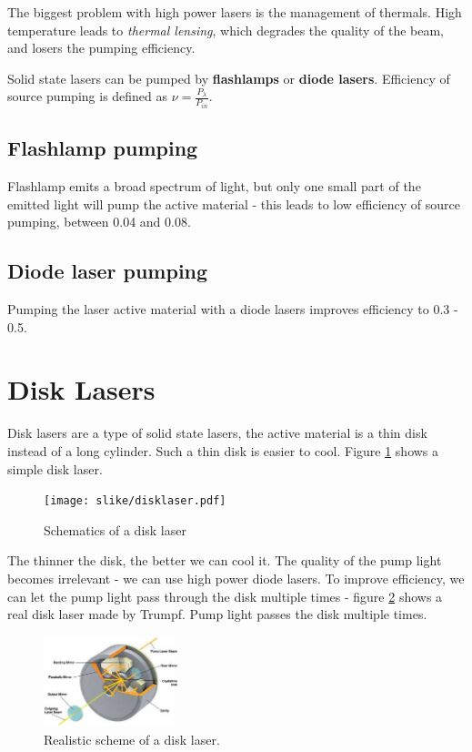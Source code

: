 The biggest problem with high power lasers is the management of thermals. 
High temperature leads to \textit{thermal lensing}, which degrades the quality of the beam, and 
losers the pumping efficiency. 

Solid state lasers can be pumped by \textbf{flashlamps} or \textbf{diode lasers}.
Efficiency of source pumping is defined as $\nu = \frac{P_{\lambda}}{P_{in}}$.

\subsection{Flashlamp pumping}

Flashlamp emits a broad spectrum of light, but only one small part of the emitted light will 
pump the active material - this leads to low efficiency of source pumping, between 0.04 and 0.08.


\subsection{Diode laser pumping}
Pumping the laser active material with a diode lasers improves efficiency to 0.3 - 0.5.

\section{Disk Lasers}

Disk lasers are a type of solid state lasers, the active material is a thin disk instead of a long cylinder.
Such a thin disk is easier to cool. Figure \ref{fig:dlaser} shows a simple disk laser.

\begin{figure}[h!]
    \centering
    \texttt{[image: slike/disklaser.pdf]}
    \caption{Schematics of a disk laser}
    \label{fig:dlaser}
\end{figure}

The thinner the disk, the better we can cool it. The quality of the pump light becomes irrelevant - we can use high power diode lasers.
To improve efficiency, we can let the pump light pass through the disk multiple times - figure 
\ref{fig:dlaser2} shows a real disk laser made by Trumpf. Pump light passes the disk multiple times.
\begin{figure}[h!]
    \centering
    \includegraphics[width=0.35\textwidth]{slike/disklaser2.jpg}
    \caption{Realistic scheme of a disk laser. \sln}
    \label{fig:dlaser2}
\end{figure}

